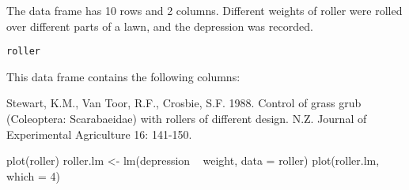 \begin{Description}\relax
The  data frame has 10 rows and 2 columns.
Different weights of roller were rolled over different parts
of a lawn, and the depression was recorded.
\end{Description}
\begin{Usage}
\begin{verbatim}roller\end{verbatim}
\end{Usage}
\begin{Format}\relax
This data frame contains the following columns:
\end{Format}
\begin{Source}\relax
Stewart, K.M., Van Toor, R.F., Crosbie,
S.F. 1988. Control of grass grub (Coleoptera: Scarabaeidae) with
rollers of different design. N.Z. Journal of Experimental Agriculture
16: 141-150.
\end{Source}
\begin{Examples}
\begin{ExampleCode}
plot(roller)
roller.lm <- lm(depression ~ weight, data = roller)
plot(roller.lm, which = 4)
\end{ExampleCode}
\end{Examples}

